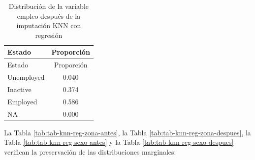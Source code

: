 \documentclass[
  spanish,
  12pt,
]{book}
\newenvironment{Shaded}{\begin{snugshade}}{\end{snugshade}}
\newcommand{\AttributeTok}[1]{\textcolor[rgb]{0.13,0.29,0.53}{#1}}
\newcommand{\FunctionTok}[1]{\textcolor[rgb]{0.13,0.29,0.53}{\textbf{#1}}}
\newcommand{\NormalTok}[1]{#1}
\newcommand{\SpecialCharTok}[1]{\textcolor[rgb]{0.81,0.36,0.00}{\textbf{#1}}}
\newcommand{\StringTok}[1]{\textcolor[rgb]{0.31,0.60,0.02}{#1}}
\begin{document}
\begin{Shaded}
\end{Shaded}

\begin{longtable}[]{@{}lc@{}}
\caption{\label{tab:tab-knn-reg-empleo-despues}Distribución de la variable empleo después de la imputación KNN con regresión}\tabularnewline
\toprule\noalign{}
Estado & Proporción \\
\midrule\noalign{}
\endfirsthead
\toprule\noalign{}
Estado & Proporción \\
\midrule\noalign{}
\endhead
\bottomrule\noalign{}
\endlastfoot
Unemployed & 0.040 \\
Inactive & 0.374 \\
Employed & 0.586 \\
NA & 0.000 \\
\end{longtable}

La Tabla \ref{tab:tab-knn-reg-zona-antes}, la Tabla \ref{tab:tab-knn-reg-zona-despues}, la Tabla \ref{tab:tab-knn-reg-sexo-antes} y la Tabla \ref{tab:tab-knn-reg-sexo-despues} verifican la preservación de las distribuciones marginales:

\begin{Shaded}
\end{Shaded}
\end{document}

